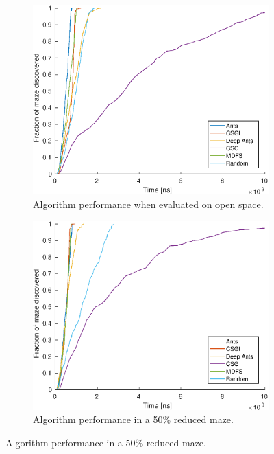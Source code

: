 \documentclass{article}
\begin{document}
\begin{figure}[H]
    \centering
    \begin{subfigure}[b]{0.45\textwidth}
        \includegraphics[width=\textwidth]{Covered_vs_time_for_3_agents_on_50x50_map_Easy=00.eps}
        \caption{ Algorithm performance when evaluated on open space.}
    \end{subfigure}
    \begin{subfigure}[b]{0.45\textwidth}
        \includegraphics[width=\textwidth]{Covered_vs_time_for_3_agents_on_50x50_map_Easy=05.eps}
        \caption{ Algorithm performance in a 50\% reduced maze. }
    \end{subfigure}


\end{figure}
\end{document}
